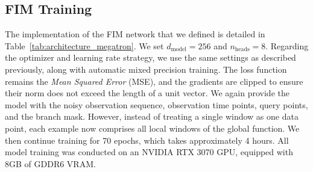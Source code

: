 \documentclass{article}
\theoremstyle{plain}
\theoremstyle{definition}
\theoremstyle{remark}
\begin{document}
\subsection{FIM Training}\label{sec:FIM}
The implementation of the FIM network that we defined is detailed in Table~\ref{tab:architecture_megatron}. 
We set \(d_\text{model} = 256\) and \(n_\text{heads} = 8\). Regarding the optimizer and learning rate strategy, 
we use the same settings as described previously, along with automatic mixed precision training. 
The loss function remains the \emph{Mean Squared Error} (MSE), and the gradients are clipped to ensure their 
norm does not exceed the length of a unit vector.
We again provide the model with the noisy observation sequence, observation time points, query points, and the branch mask. However, instead of treating a single window as one data point, each example now comprises all local windows of the global function. We then continue training for 70 epochs, which takes approximately 4 hours. All model training was conducted on an NVIDIA RTX 3070 GPU, equipped with 8GB of GDDR6 VRAM.
\end{document}
